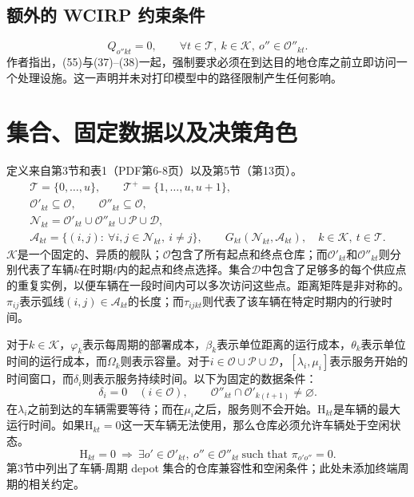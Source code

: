 \documentclass[10pt]{article}
\begin{document}
\subsection*{额外的 WCIRP 约束条件}
\begin{equation}
 Q_{o''kt}=0,\qquad\forall t\in\mathcal T,\ k\in\mathcal K,\ o''\in\mathcal O''_{kt}.\tag{55}
\end{equation}
作者指出，(55)与(37)--(38)一起，强制要求必须在到达目的地仓库之前立即访问一个处理设施。这一声明并未对打印模型中的路径限制产生任何影响。

\section*{集合、固定数据以及决策角色}
定义来自第3节和表1（PDF第6-8页）以及第5节（第13页）。
\begin{gather*}
\mathcal T=\{0,\ldots,u\},\qquad
\mathcal T^+=\{1,\ldots,u,u+1\},\\
\mathcal O'_{kt}\subseteq\mathcal O,\qquad
\mathcal O''_{kt}\subseteq\mathcal O,\\
\mathcal N_{kt}=\mathcal O'_{kt}\cup\mathcal O''_{kt}\cup\mathcal P\cup\mathcal D,\\
\mathcal A_{kt}=\{(i,j):\ \forall i,j\in\mathcal N_{kt},\ i\ne j\},\qquad
G_{kt}(\mathcal N_{kt},\mathcal A_{kt}),\quad k\in\mathcal K,\ t\in\mathcal T.
\end{gather*}
$\mathcal K$是一个固定的、异质的舰队；$\mathcal O$包含了所有起点和终点仓库；而$\mathcal O'_{kt}$和$\mathcal O''_{kt}$则分别代表了车辆$k$在时期$t$内的起点和终点选择。集合$\mathcal D$中包含了足够多的每个供应点的重复实例，以便车辆在一段时间内可以多次访问这些点。距离矩阵是非对称的。$\pi_{ij}$表示弧线$(i,j)\in\mathcal A_{kt}$的长度；而$\tau_{ijkt}$则代表了该车辆在特定时期内的行驶时间。

对于$k\in\mathcal K$，$\varphi_k$表示每周期的部署成本，$\beta_k$表示单位距离的运行成本，$\theta_k$表示单位时间的运行成本，而$\Omega_k$则表示容量。对于$i\in\mathcal O\cup\mathcal P\cup\mathcal D$，$[\lambda_i,\mu_i]$表示服务开始的时间窗口，而$\delta_i$则表示服务持续时间。以下为固定的数据条件：
\[
\delta_i=0\quad(i\in\mathcal O),\qquad
\mathcal O''_{kt}\cap\mathcal O'_{k(t+1)}\ne\varnothing.
\]
在$\lambda_i$之前到达的车辆需要等待；而在$\mu_i$之后，服务则不会开始。$\mathrm H_{kt}$是车辆的最大运行时间。如果$\mathrm H_{kt}=0$这一天车辆无法使用，那么仓库必须允许车辆处于空闲状态。
\[
\mathrm H_{kt}=0\ \Longrightarrow\
\exists o'\in\mathcal O'_{kt},\ o''\in\mathcal O''_{kt}\ \text{such that }\pi_{o'o''}=0.
\]
第3节中列出了车辆-周期 depot 集合的仓库兼容性和空闲条件；此处未添加终端周期的相关约定。
\end{document}
